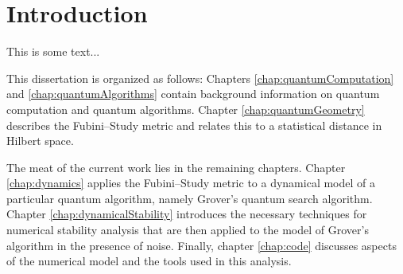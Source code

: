 


\chapter{Introduction}
\label{chap:introduction}
%

This is some text...


This dissertation is organized as follows:  Chapters \ref{chap:quantumComputation}
and \ref{chap:quantumAlgorithms} contain background information on quantum computation
and quantum algorithms.
Chapter \ref{chap:quantumGeometry} describes the
Fubini--Study metric and relates this to a statistical distance in Hilbert space.

The meat of the current work lies in the remaining chapters.  
Chapter \ref{chap:dynamics} applies the Fubini--Study  metric to a dynamical 
model of a particular quantum algorithm, namely Grover's quantum search algorithm.  
Chapter \ref{chap:dynamicalStability} introduces the
necessary techniques for numerical stability analysis that are then applied to
the model of Grover's algorithm in the presence of noise. 
Finally, chapter \ref{chap:code} discusses aspects of the numerical model and the 
tools used in this analysis. 


